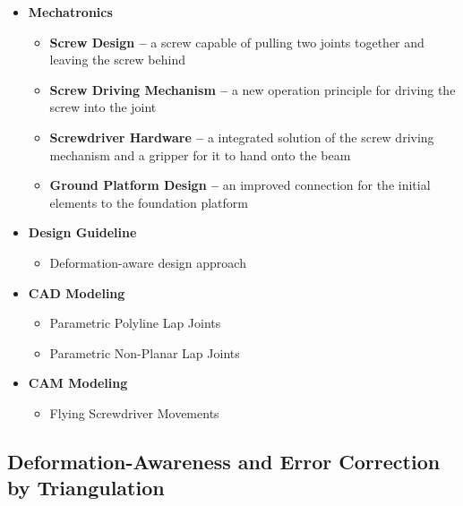 \begin{itemize}
    \item \textbf{Mechatronics}
    \begin{itemize}
        \item \textbf{Screw Design --} a screw capable of pulling two joints together and leaving the screw behind 
        \item \textbf{Screw Driving Mechanism --} a new operation principle for driving the screw into the joint 
        \item \textbf{Screwdriver Hardware --} a integrated solution of the screw driving mechanism and a gripper for it to hand onto the beam 
        \item \textbf{Ground Platform Design --} an improved connection for the initial elements to the foundation platform 
    \end{itemize}
    \item \textbf{Design Guideline}
    \begin{itemize}
        \item Deformation-aware design approach 
    \end{itemize}
    \item \textbf{CAD Modeling}
    \begin{itemize}
        \item Parametric Polyline Lap Joints 
    \end{itemize}
    \begin{itemize}
        \item Parametric Non-Planar Lap Joints
    \end{itemize}
    \item \textbf{CAM Modeling}
    \begin{itemize}
        \item Flying Screwdriver Movements
    \end{itemize}
\end{itemize}

\subsection{Deformation-Awareness and Error Correction by Triangulation}
\label{subsection:exploration-4-deformation-awareness-and-error-correction-by-triangulation}


